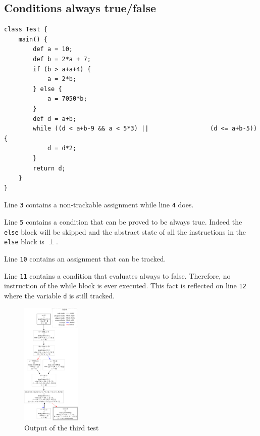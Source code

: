 \documentclass{article}
\newcommand{\linenum}[1]{\texttt{#1}}
\begin{document}
\subsection{Conditions always true/false}
\begin{lstlisting}
class Test {
    main() {
        def a = 10;
        def b = 2*a + 7;
        if (b > a+a+4) {
            a = 2*b;
        } else {
            a = 7050*b;
        }
        def d = a+b;
        while ((d < a+b-9 && a < 5*3) ||                 (d <= a+b-5)) {
            d = d*2;
        }
        return d;
    }
}
\end{lstlisting}

Line \linenum{3} contains a non-trackable assignment while line \linenum{4} does.

\noindent
Line \linenum{5} contains a condition that can be proved to be always true. Indeed the \texttt{else} block will be skipped and the abstract state of all the instructions in the \texttt{else} block is $\perp$.

\noindent
Line \linenum{10} contains an assignment that can be tracked.

\noindent
Line \linenum{11} contains a condition that evaluates always to false. Therefore, no instruction of the while block is ever executed.
This fact is reflected on line \linenum{12} where the variable \texttt{d} is still tracked.



\begin{figure}[H]
    \centering
    \includegraphics[width=0.25\textwidth]{test3.pdf}
    \caption{Output of the third test}
\end{figure}



\printbibliography
\end{document}
